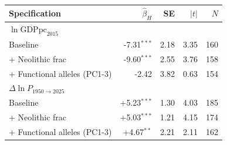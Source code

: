\begin{tabular}{lrrrr}
\toprule
Specification & $\hat\beta_{H}$ & SE & $|t|$ & $N$ \\
\midrule
\multicolumn{5}{l}{\textit{$\ln\text{GDPpc}_{2015}$}} \\
\quad Baseline & -7.31$^{***}$ & 2.18 & 3.35 & 160 \\
\quad + Neolithic frac & -9.60$^{***}$ & 2.55 & 3.76 & 158 \\
\quad + Functional alleles (PC1-3) & -2.42 & 3.82 & 0.63 & 154 \\
\midrule
\multicolumn{5}{l}{\textit{$\Delta\ln\!P_{1950\to2025}$}} \\
\quad Baseline & +5.23$^{***}$ & 1.30 & 4.03 & 185 \\
\quad + Neolithic frac & +5.03$^{***}$ & 1.21 & 4.15 & 174 \\
\quad + Functional alleles (PC1-3) & +4.67$^{**}$ & 2.21 & 2.11 & 162 \\
\bottomrule
\end{tabular}
